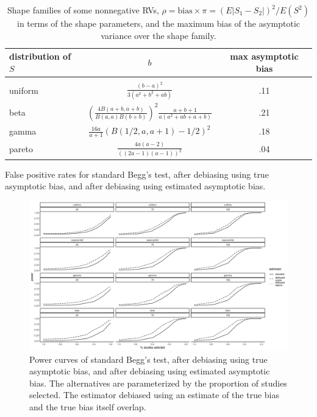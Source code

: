 \documentclass[12pt]{article}
\newcommand{\E}{E}
\newcommand{\biasratio}{b}%
\newcommand{\comment}[1]{
  \iftoggle{commenttoggle}{
    {\normalsize{\color{red}{ #1}}\normalsize}
  }
  {}
}
\begin{document}
\begin{table}
    \begin{tabular}{l c c}
    distribution of $S$ & $\biasratio$ & max asymptotic bias \\
    \hline\\
    uniform  & $\frac{(b-a)^2}{3(a^2+b^2+ab)}$  & .11\\
    beta & $\left(\frac{4B(a+b,a+b)}{B(a,a)B(b+b)}\right)^2\frac{a+b+1}{a(a^2+ab+a+b)}$ & .21\\
    gamma & $\frac{16a}{a+1}(B(1/2,a,a+1)-1/2)^2$ & .18\\
    pareto & $\frac{4a(a-2)}{((2a-1)(a-1))^2}$ & .04\\
  \end{tabular}
  \caption{Shape families of some nonnegative RVs, $\rho=\text{bias}\times\pi=(\E|S_1-S_2|)^2/E(S^2)$ in
    terms of the shape parameters, and the maximum bias of the
    asymptotic variance over the shape family.}
  \label{table:biasratio}
\end{table}

\begin{table}
  
  \caption{False positive rates for standard Begg's test, after debiasing using true asymptotic bias, and after debiasing using estimated asymptotic bias.}
  \label{table:fpr}
\end{table}


\begin{figure}
  \includegraphics[width=\linewidth]{power_curves.png}
  \caption{Power curves of standard Begg's test, after debiasing using true asymptotic bias, and after debiasing using estimated asymptotic bias. The alternatives are parameterized by the proportion of studies selected. The estimator debiased using an estimate of the true bias and the true bias itself overlap.\comment{increase size of plot}}
  \label{fig:power}
\end{figure}
\end{document}
